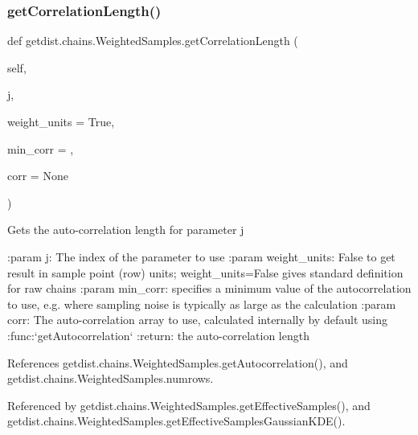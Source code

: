 \subsubsection{\texorpdfstring{get\+Correlation\+Length()}{getCorrelationLength()}}
{\footnotesize\ttfamily def getdist.\+chains.\+Weighted\+Samples.\+get\+Correlation\+Length (\begin{DoxyParamCaption}\item[{}]{self,  }\item[{}]{j,  }\item[{}]{weight\+\_\+units = {\ttfamily True},  }\item[{}]{min\+\_\+corr = {},  }\item[{}]{corr = {\ttfamily None} }\end{DoxyParamCaption})}

\begin{DoxyVerb}Gets the auto-correlation length for parameter j

:param j: The index of the parameter to use
:param weight_units: False to get result in sample point (row) units; weight_units=False gives standard definition for raw chains
:param min_corr: specifies a minimum value of the autocorrelation to use, e.g. where sampling noise is typically as large as the calculation
:param corr: The auto-correlation array to use, calculated internally by default using :func:`getAutocorrelation`
:return: the auto-correlation length
\end{DoxyVerb}
 

References getdist.\+chains.\+Weighted\+Samples.\+get\+Autocorrelation(), and getdist.\+chains.\+Weighted\+Samples.\+numrows.



Referenced by getdist.\+chains.\+Weighted\+Samples.\+get\+Effective\+Samples(), and getdist.\+chains.\+Weighted\+Samples.\+get\+Effective\+Samples\+Gaussian\+K\+D\+E().

